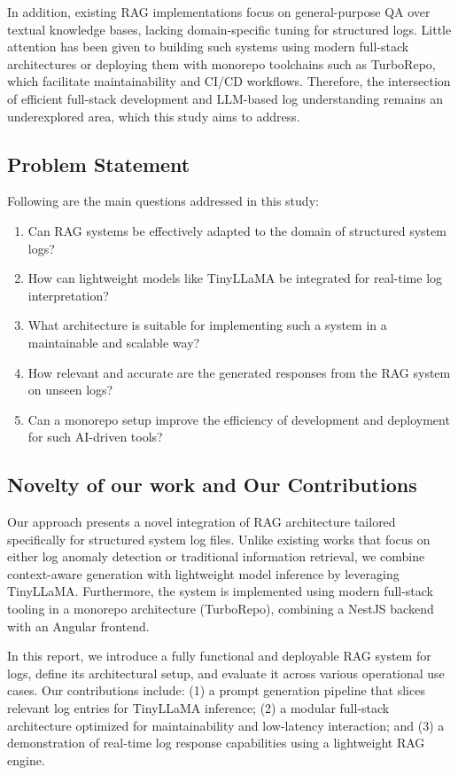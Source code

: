 \documentclass[conference]{IEEEtran}
\begin{document}
In addition, existing RAG implementations focus on general-purpose QA over textual knowledge bases, lacking domain-specific tuning for structured logs. Little attention has been given to building such systems using modern full-stack architectures or deploying them with monorepo toolchains such as TurboRepo, which facilitate maintainability and CI/CD workflows. Therefore, the intersection of efficient full-stack development and LLM-based log understanding remains an underexplored area, which this study aims to address.

\subsection{Problem Statement}

Following are the main questions addressed in this study:

\begin{enumerate}
    \item Can RAG systems be effectively adapted to the domain of structured system logs?
    \item How can lightweight models like TinyLLaMA be integrated for real-time log interpretation?
    \item What architecture is suitable for implementing such a system in a maintainable and scalable way?
    \item How relevant and accurate are the generated responses from the RAG system on unseen logs?
    \item Can a monorepo setup improve the efficiency of development and deployment for such AI-driven tools?
\end{enumerate}

\subsection{Novelty of our work and Our Contributions}

Our approach presents a novel integration of RAG architecture tailored specifically for structured system log files. Unlike existing works that focus on either log anomaly detection or traditional information retrieval, we combine context-aware generation with lightweight model inference by leveraging TinyLLaMA. Furthermore, the system is implemented using modern full-stack tooling in a monorepo architecture (TurboRepo), combining a NestJS backend with an Angular frontend.

In this report, we introduce a fully functional and deployable RAG system for logs, define its architectural setup, and evaluate it across various operational use cases. Our contributions include: (1) a prompt generation pipeline that slices relevant log entries for TinyLLaMA inference; (2) a modular full-stack architecture optimized for maintainability and low-latency interaction; and (3) a demonstration of real-time log response capabilities using a lightweight RAG engine.
\end{document}
